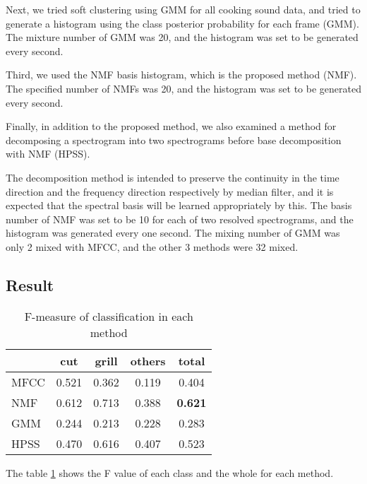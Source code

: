 \documentclass[sigchi]{acmart}
\begin{document}
Next, we tried soft clustering using GMM for all cooking sound data, and tried to generate a histogram using the class posterior probability for each frame (GMM). The mixture number of GMM was 20, and the histogram was set to be generated every second.

Third, we used the NMF basis histogram, which is the proposed method (NMF). The specified number of NMFs was 20, and the histogram was set to be generated every second.

Finally, in addition to the proposed method, we also examined a method for decomposing a spectrogram into two spectrograms before base decomposition with NMF (HPSS).

The decomposition method is intended to preserve the continuity in the time direction and the frequency direction respectively by median filter, and it is expected that the spectral basis will be learned appropriately by this.
The basis number of NMF was set to be 10 for each of two resolved spectrograms, and the histogram was generated every one second.
The mixing number of GMM was only 2 mixed with MFCC, and the other 3 methods were 32 mixed.

\subsection{Result}
\begin{table}[t]
\centering
\caption{F-measure of classification in each method}
\vspace{5pt}
\label{result}
\begin{tabular}{l|ccc|c}
\hline
\hline
                       & cut   & grill & others & total \\ \hline
MFCC   & 0.521 & 0.362 & 0.119  & 0.404 \\ %
NMF & 0.612 & 0.713 & 0.388  &  {\bf 0.621} \\ %
GMM & 0.244 & 0.213 & 0.228  & 0.283 \\ %
HPSS & 0.470 &  0.616 & 0.407  & 0.523 \\ \hline\hline
\end{tabular}
\end{table}

The table \ref{result} shows the F value of each class and the whole for each method.
\end{document}

